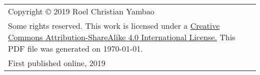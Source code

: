 \thispagestyle{empty}

    \vspace*{\fill}
\begin{flushleft}

\begin{tabularx}{\textwidth}{Y}
Copyright © 2019 Roel Christian Yambao\\
\addlinespace
Some rights reserved. This work is licensed under a
\href{https://creativecommons.org/licenses/by-sa/4.0/}{Creative Commons
Attribution-ShareAlike 4.0 International License.} This PDF file was generated on \today.\\
\addlinespace
First published online, 2019

\end{tabularx}

\end{flushleft}
